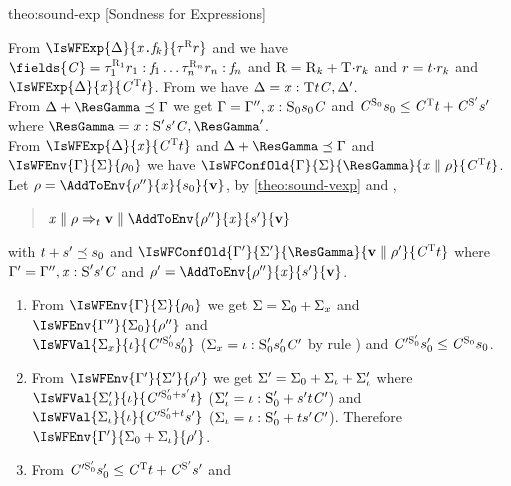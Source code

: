 \begin{proofOf}{theo:sound-exp} [Sondness for Expressions]
\begin{description}
From $\IsWFExp{\Delta}{\FieldAccess{\x}{\f_k}}{\Graded{\tau}{\Rgr}{\rgr}}$ and  
we have $\fields{\C}=\Field{\Graded{\tau_1}{\Rgr_1}{\rgr_1}}{\f_1} \ldots \Field{\Graded{\tau_n}{\Rgr_n}{\rgr_n}}{\f_n}$ and
$\textsc{R}=\textsc{R}_k+\textsc{T}{\cdot}r_k$ and $r=t{\cdot}r_k$ 
and
$\IsWFExp{\Delta}{\x}{\Graded{\C}{\Tgr}{\tgr}}$. From
  we have $\Delta=\mathit{x} :\textsc{T}{t}{\mathit{C}},\Delta'$.
\\
%
From  
$\Delta\ctxsum\ResGamma\ctxord\Gamma$ we get $\Gamma=\Gamma'',\mathit{x} :\textsc{S}_0{s_0}{\mathit{C}}$ and 
$\mathit{C}^{\textsc{S}_0}{s_0}\leq\mathit{C}^{\textsc{T}}{t}+\mathit{C}^{\textsc{S}'}{s'}$ where $\ResGamma=\CtxElem{\x}{\Sgr'}{\sgr'}{\C},\ResGamma'$.
\\
From 
$\IsWFExp{\Delta}{\x}{\Graded{\C}{\Tgr}{\tgr}}$ and $\Delta\ctxsum\ResGamma\ctxord\Gamma$ and $\IsWFEnv{\Gamma}{\Sigma}{\env_0}$ we have
$\IsWFConfOld{\Gamma}{\Sigma}{\ResGamma}{\VConf{\x}{\env}}{\Graded{\C}{\Tgr}{\tgr}}$. 
\\
Let $\env=\AddToEnv{\env''}{\x}{\sgr_0}{\val}$,  by  \cref{theo:sound-vexp} and ,
 \begin{quote}
$\RedVal{\x}{\env}{\tgr}{\val}{\AddToEnv{\env''}{\x}{\sgr'}{\val}}$
\end{quote}
with $t+s'\preceq s_0$ and 
$\IsWFConfOld{\Gamma'}{\Sigma'}{\ResGamma}{\VConf{\val}{\env'}}{\Graded{\C}{\Tgr}{\tgr}}$ where $\Gamma'=\Gamma'',\mathit{x} :\textsc{S}'{s'}{\mathit{C}}$
and $\env'=\AddToEnv{\env''}{\x}{\sgr'}{\val}$. 
\begin{enumerate}[(1)]
\item\label{p1} From $\IsWFEnv{\Gamma}{\Sigma}{\env_0}$ we get $\Sigma=\Sigma_0+\Sigma_{\mathit{x}}$ and  $\IsWFEnv{\Gamma''}{\Sigma_0}{\env''}$ and \\
$\IsWFVal{\Sigma_x}{\loc}{\Graded{\C'}{\Sgr'_0}{\sgr'_0}}$
($\Sigma_x=\iota :\textsc{S}'_0{s'_0}{\mathit{C}'}$ by rule ) and
$\mathit{C}'^{\textsc{S}'_0}{s'_0}\leq\mathit{C}^{\textsc{S}_0}{s_0}$.
\item\label{p2} From $\IsWFEnv{\Gamma'}{\Sigma'}{\env'}$ we get $\Sigma'=\Sigma_0+\Sigma_{\iota}+\Sigma'_{\iota}$ where 
 $\IsWFVal{\Sigma'_{\iota}}{\loc}{\Graded{\C'}{\Sgr'_0\rsum\sgr'}{\tgr}}$ ($\Sigma'_{\iota}=\iota :\textsc{S}'_0+s'{t}{\mathit{C}'}$) and  
$\IsWFVal{\Sigma_{\iota}}{\loc}{\Graded{\C'}{\Sgr'_0\rsum\tgr}{\sgr'}}$ ($\Sigma_{\iota}=\iota :\textsc{S}'_0+t{s'}{\mathit{C}'}$). Therefore
$\IsWFEnv{\Gamma'}{\Sigma_0\ctxsum\Sigma_{\iota}}{\env'}$.
\item\label{p3} From  $\mathit{C}'^{\textsc{S}'_0}{s'_0}\leq\mathit{C}^{\textsc{T}}{t}+\mathit{C}^{\textsc{S}'}{s'}$ and 

\end{enumerate}
\end{description}
\end{proofOf}
